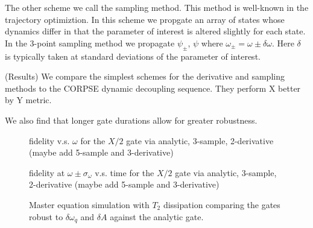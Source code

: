 \documentclass[
  amsfonts,
  amsmath,
  tbtags,
  amssymb,
  aps,
  nobibnotes,
  prl,
  twocolumn,
]{revtex4-2}
\begin{document}
The other scheme we call the sampling method. This method
is well-known in the trajectory optimiztion. In this scheme
we propgate an array of states whose dynamics differ
in that the parameter of interest is altered slightly
for each state. In the 3-point sampling method we
propagate $\psi_{\pm}$, $\psi$ where
$\omega_{\pm} = \omega \pm \delta \omega$. Here $\delta$ is
typically taken at standard deviations of the parameter
of interest.

(Results) We compare the simplest schemes
for the derivative and sampling methods to
the CORPSE dynamic decoupling sequence.
They perform X better by Y metric.

We also find that longer gate durations allow for
greater robustness.

\begin{figure}
  \caption{fidelity v.s. $\omega$ for the $X/2$ gate via
    analytic, 3-sample, 2-derivative (maybe add 5-sample and 3-derivative)}
\end{figure}

\begin{figure}
  \caption{fidelity at $\omega \pm \sigma_{\omega}$ v.s. time for the
    $X/2$ gate via analytic, 3-sample, 2-derivative
    (maybe add 5-sample and 3-derivative)}
\end{figure}

\begin{figure}
  \caption{Master equation simulation with $T_{2}$ dissipation
    comparing the gates robust to $\delta \omega_{q}$ and $\delta A$ against
    the analytic gate.}
\end{figure}


\end{document}
